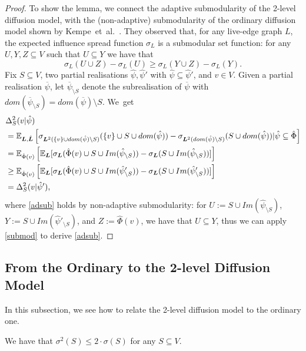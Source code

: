 \begin{proof}
To show the lemma, we connect the adaptive submodularity of the 2-level diffusion model, with the (non-adaptive) submodularity of the ordinary diffusion model shown by Kempe~et~al.~\cite{Kempe2015}. They observed that, for any live-edge graph $L$,  the expected influence spread function $\sigma_L$ is a submodular set function: for any $U,Y,Z\subseteq V$ such that $U\subseteq Y$ we have that 
\begin{equation}\label{submod}
\sigma_L(U\cup Z)-\sigma_L(U)\geq \sigma_L(Y\cup Z)-\sigma_L(Y).
\end{equation}
Fix $S\subseteq V$, two partial realisations $\hat{\psi},\hat{\psi}'$ with $\hat{\psi}\subseteq \hat{\psi}'$, and $v\in V$. Given a partial realisation $\overline{\psi}$, let $\overline{\psi}_{\setminus S}$ denote the subrealisation of $\overline{\psi}$ with $dom(\overline{\psi}_{\setminus S})=dom(\overline{\psi})\setminus S$. We~get
\begin{align}
&\Delta^2_S(v|\hat{\psi})\nonumber\\
&=\mathbb{E}_{\bm L,\hat{\bm L}}\left[\sigma_{\bm L^2(\{v\}\cup dom(\hat{\psi})\setminus S)}(\{v\}\cup S\cup dom(\hat{\psi}))-\sigma_{\bm L^2(dom(\hat{\psi})\setminus S)}(S\cup dom(\hat{\psi}))|\hat{\psi}\subseteq \hat{\Phi}\right]\nonumber\\
&=\mathbb{E}_{\hat{\Phi}(v)}\left[\mathbb{E}_{\bm L}[\sigma_{\bm L}(\hat{\Phi}(v)\cup S\cup Im(\hat{\psi}_{\setminus S}))-\sigma_{\bm L}(S\cup  Im(\hat{\psi}_{\setminus S}))]\right]\nonumber\\
&\geq \mathbb{E}_{\hat{\Phi}(v)}\left[\mathbb{E}_{\bm L}[\sigma_{\bm L}(\hat{\Phi}(v)\cup S\cup Im(\hat{\psi}'_{\setminus S}))-\sigma_{\bm L}( S\cup Im(\hat{\psi}'_{\setminus S}))]\right]\label{adsub}\\
&=\Delta_S^2(v|\hat{\psi}'),\nonumber
\end{align}
where \eqref{adsub} holds by non-adaptive submodularity: for $U:=S\cup Im(\hat{\psi}_{\setminus S})$, $Y:=S\cup Im(\hat{\psi}'_{\setminus S})$, and $Z:=\hat{\Phi}(v)$, we have that $U\subseteq Y$, thus we can apply \eqref{submod} to derive \eqref{adsub}. 
\end{proof}



\subsection{From the Ordinary to the 2-level Diffusion Model}\label{sub2}
In this subsection, we see how to relate the 2-level diffusion model to the ordinary one.
\begin{lemma}\label{cla1}
We have that $\sigma^2(S)\leq 2\cdot \sigma(S)$ for any $S\subseteq V$.
\end{lemma}

